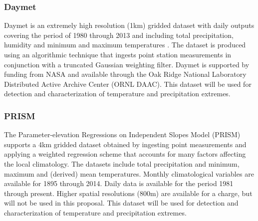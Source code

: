 \documentclass[11pt]{article}
\begin{document}
\subsubsection*{Daymet} \label{sec:DAYMET}

Daymet is an extremely high resolution (1km) gridded dataset with daily outputs covering the period of 1980 through 2013 and including total precipitation, humidity and minimum and maximum temperatures \citep{thornton1997generating, thornton1999improved, thornton2000simultaneous}.  The dataset is produced using an algorithmic technique that ingests point station measurements in conjunction with a truncated Gaussian weighting filter.  Daymet is supported by funding from NASA and available through the Oak Ridge National Laboratory Distributed Active Archive Center (ORNL DAAC).  This dataset will be used for detection and characterization of temperature and precipitation extremes.

\subsubsection*{PRISM} \label{sec:PRISM}

The Parameter-elevation Regressions on Independent Slopes Model (PRISM) \citep{daly2008physiographically} supports a 4km gridded dataset obtained by ingesting point measurements and applying a weighted regression scheme that accounts for many factors affecting the local climatology.  The datasets include total precipitation and minimum, maximum and (derived) mean temperatures.  Monthly climatological variables are available for 1895 through 2014.  Daily data is available for the period 1981 through present.  Higher spatial resolutions (800m) are available for a charge, but will not be used in this proposal.  This dataset will be used for detection and characterization of temperature and precipitation extremes.



\end{document}
